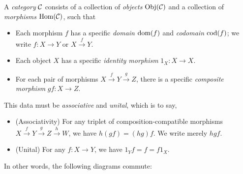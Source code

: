 


\begin{dfn*}[Category]
	A \emph{category} $\mathcal{C}$ consists of a collection of \emph{objects} $\operatorname{Obj}(\mathcal{C})$
	and a collection of \emph{morphisms} $\operatorname{Hom}(\mathcal{C})$, such that

	\begin{itemize}
		\item Each morphism $f$ has a specific \emph{domain} $\operatorname{dom}(f)$ and
		      \emph{codomain} $\operatorname{cod}(f)$; we write $f: X\rightarrow Y$ or
		      $X\xrightarrow{f} Y$.
		\item Each object $X$ has a specific \emph{identity morphism} $1_X:
			      X\rightarrow X$.
		\item For each pair of morphisms $X\xrightarrow{f} Y\xrightarrow{g}
			      Z$, there is a specific \emph{composite morphism} $gf:
			      X\rightarrow Z$.
	\end{itemize}
	This data must be \emph{associative} and \emph{unital}, which is to say,
	\begin{itemize}
		\item (Associativity) For any triplet of composition-compatible morphisms
		      $X\xrightarrow{f}Y \xrightarrow{g}Z\xrightarrow{h}W$, we have $h(gf) =
			      (hg)f$. We write merely $hgf$.
		\item (Unital) For any $f: X\rightarrow Y$, we have $1_Yf = f = f1_X$.
	\end{itemize}

	In other words, the following diagrams commute:

	\begin{figure}[H]
		\centering
		\begin{multicols}{2}

		\end{multicols}
	\end{figure}
\end{dfn*}


